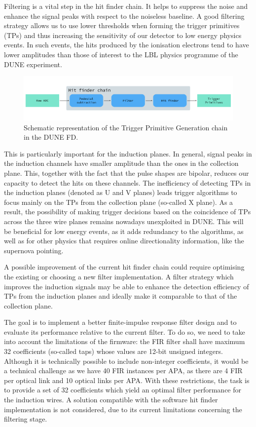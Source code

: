 Filtering is a vital step in the hit finder chain. It helps to suppress the noise and enhance the signal peaks with respect to the noiseless baseline. A good filtering strategy allows us to use lower thresholds when forming the trigger primitives (TPs) and thus increasing the sensitivity of our detector to low energy physics events. In such events, the hits produced by the ionisation electrons tend to have lower amplitudes than those of interest to the LBL physics programme of the DUNE experiment.

\begin{figure}[t]
	\centering
	\includegraphics[width=0.99\linewidth]{Images/Matched_Filter/trigger_primitive_chain.pdf}
	\caption{Schematic representation of the Trigger Primitive Generation chain in the DUNE FD.}
	\label{fig:tpg_chain}
\end{figure}

This is particularly important for the induction planes. In general, signal peaks in the induction channels have smaller amplitude than the ones in the collection plane. This, together with the fact that the pulse shapes are bipolar, reduces our capacity to detect the hits on these channels. The inefficiency of detecting TPs in the induction planes (denoted as U and V planes) leads trigger algorithms to focus mainly on the TPs from the collection plane (so-called X plane). As a result, the possibility of making trigger decisions based on the coincidence of TPs across the three wire planes remains nowadays unexploited in DUNE. This will be beneficial for low energy events, as it adds redundancy to the algorithms, as well as for other physics that requires online directionality information, like the supernova pointing.

A possible improvement of the current hit finder chain could require optimising the existing or choosing a new filter implementation. A filter strategy which improves the induction signals may be able to enhance the detection efficiency of TPs from the induction planes and ideally make it comparable to that of the collection plane.  

The goal is to implement a better finite-impulse response filter design and to evaluate its performance relative to the current filter. To do so, we need to take into account the limitations of the firmware: the FIR filter shall have maximum 32 coefficients (so-called taps) whose values are 12-bit unsigned integers. Although it is technically possible to include non-integer coefficients, it would be a technical challenge as we have 40 FIR instances per APA, as there are 4 FIR per optical link and 10 optical links per APA. With these restrictions, the task is to provide a set of 32 coefficients which yield an optimal filter performance for the induction wires. A solution compatible with the software hit finder implementation is not considered, due to its current limitations concerning the filtering stage.

